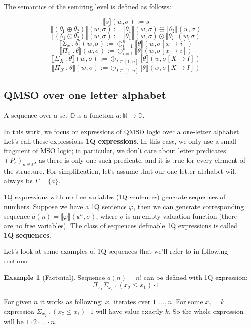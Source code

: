 \documentclass[12pt]{article}
\theoremstyle{definition}
\newtheorem{example}{Example}[section]
\begin{document}
The semantics of the semiring level is defined as follows:

$$\llbracket s\rrbracket(w, \sigma) := s$$
$$\llbracket(\theta_1 \oplus \theta_2)\rrbracket(w, \sigma) := \llbracket\theta_1\rrbracket(w, \sigma) \oplus \llbracket\theta_2\rrbracket(w, \sigma)$$
$$\llbracket(\theta_1 \odot \theta_2)\rrbracket(w, \sigma) := \llbracket\theta_1\rrbracket(w, \sigma) \odot \llbracket\theta_2\rrbracket(w, \sigma)$$
$$\llbracket \Sigma_x \ . \ \theta \rrbracket(w, \sigma) := \oplus^n_{i=1}\llbracket \theta \rrbracket (w, \sigma[x \rightarrow i])$$
$$\llbracket \Pi_x \ . \ \theta \rrbracket(w, \sigma) := \odot^n_{i=1}\llbracket \theta \rrbracket (w, \sigma[x \rightarrow i])$$
$$\llbracket \Sigma_X \ . \ \theta \rrbracket(w, \sigma) := \oplus_{I \subseteq [1,n]}\llbracket \theta \rrbracket (w, \sigma[X \rightarrow I])$$
$$\llbracket \Pi_X \ . \ \theta \rrbracket(w, \sigma) := \odot_{I \subseteq [1,n]}\llbracket \theta \rrbracket (w, \sigma[X \rightarrow I])$$

\subsection{QMSO over one letter alphabet}

A sequence over a set $\mathbb{D}$ is a function $a : \mathbb{N} \rightarrow \mathbb{D}$.

In this work, we focus on expressions of QMSO logic over a one-letter alphabet. Let's call these expressions \textbf{1Q expressions}. In this case, we only use a small fragment of MSO logic; in particular, we don't care about letter predicates $(P_a)_{a \in \Gamma}$, as there is only one such predicate, and it is true for every element of the structure. For simplification, let's assume that our one-letter alphabet will always be $\Gamma = \{a\}$.

1Q expressions with no free variables (1Q sentences) generate sequences of numbers. Suppose we have a 1Q sentence $\varphi$, then we can generate corresponding sequence $a(n) = \llbracket \varphi \rrbracket (a^n, \sigma)$, where $\sigma$ is an empty valuation function (there are no free variables). The class of sequences definable 1Q expressions is called \textbf{1Q sequences}.

Let's look at some examples of 1Q sequences that we'll refer to in following sections:

\begin{example}[Factorial]
\label{ExSeqFactorial}
    Sequence $a(n) = n!$ can be defined with 1Q expression: 
    $$\Pi_{x_1}\Sigma_{x_2} \ . \ (x_2 \leq x_1) \cdot 1$$

    For given $n$ it works as following: $x_1$ iterates over $1,\ldots,n$. For some $x_1 = k$ expression $\Sigma_{x_2} \ . \ (x_2 \leq x_1) \cdot 1$ will have value exactly $k$. So the whole expression will be $1 \cdot 2 \cdot \ldots \cdot n$.
\end{example}
\end{document}
